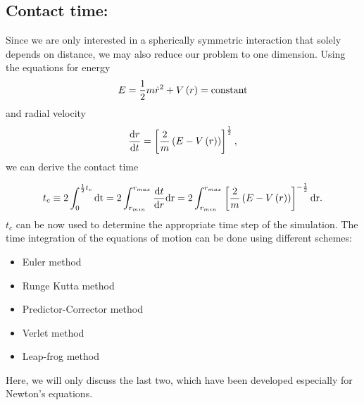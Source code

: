 \subsection{Contact time:}
\label{subsec:contact_time}

Since we are only interested in a spherically symmetric interaction that solely depends on distance, we may also reduce our problem to one dimension. Using the equations for energy
$$
E= \frac{1}{2} m\dot{r}^2 + V\left(r\right) = \text{constant}
$$ 
and radial velocity
$$
\frac{\text{d} r}{\text{d} t} = \left[\frac{2}{m} \left(E-V\left(r\right)\right)\right]^{\frac{1}{2}},
$$
we can derive the contact time

\begin{equation}
t_c \equiv 2\int_0^{\frac{1}{2}t_c} {\text{dt}} = 
2\int_{r_{min}}^{r_{max}} {\frac{\text{d} t}{\text{d} r}\text{dr}} =
2\int_{r_{min}}^{r_{max}} {    \left[\frac{2}{m} \left(E-V\left(r\right)\right)\right]^{-\frac{1}{2}}  \text{dr}}.
\label{eq:contact_time}
\end{equation}
$t_c$ can be now used to determine the appropriate time step of the simulation. The time integration of the equations of motion can be done using different schemes:
\begin{itemize}
\item Euler method
\item Runge Kutta method
\item Predictor-Corrector method
\item Verlet method
\item Leap-frog method
\end{itemize}
Here, we will only discuss the last two, which have been developed especially for Newton's equations.















